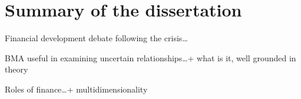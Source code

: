 \chapter{Summary of the dissertation}
\label{ch1}
Financial development debate following the crisis\dots

\ac{BMA} useful in examining uncertain relationships\dots + what is it, well grounded in theory

Roles of finance\dots + multidimensionality